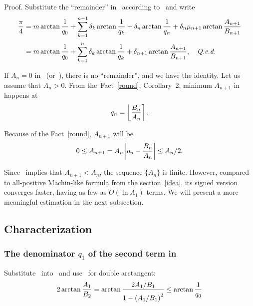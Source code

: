 \documentclass[draft, 10pt]{article} %
\def\fact#1{Fact~\ref{#1}}
\begin{document}
Proof. Substitute the ``remainder'' in~
according to~ and write
$$
\begin{array}{ll}
\dfrac{\pi}{4} = m \arctan\dfrac{1}{q_0}
    + \sum_{k=1}^{n-1} \delta_k \arctan\dfrac{1}{q_k}
    + \delta_n \arctan\dfrac{1}{q_n}
    + \delta_n \mu_{n+1} \arctan\dfrac{A_{n+1}}{B_{n+1}} \\[16pt]
\phantom{\dfrac{\pi}{4}} = m \arctan\dfrac{1}{q_0}
    + \sum_{k=1}^n \delta_k \arctan\dfrac{1}{q_k}
    + \delta_{n+1} \arctan\dfrac{A_{n+1}}{B_{n+1}}, \quad\hbox{\qed}
\end{array}
$$

If $A_n = 0$ in~ (or~),
there is no ``remainder'', and we have the
identity. Let us assume that $A_n > 0$.
From the~\fact{round}, Corollary~2, minimum $A_{n+1}$ in~
happens at
%
\begin{equation}\mlabel{q-next}
q_n = \nround{\dfrac{B_n}{A_n}}.
\end{equation}

Because of the \fact{round}, $A_{n+1}$ will be
%
\begin{equation}\mlabel{decay-a}
0 \le A_{n+1} = A_n \absolute{q_n - \dfrac{B_n}{A_n}} \le A_n / 2.
\end{equation}

Since~ implies that $A_{n+1} < A_n$, the sequence $\{ A_n \}$ is finite.
However, compared to all-positive Machin-like formula from the section~\ref{idea},
its signed version~ converges faster, having as few as
$O(\ln A_1)$ terms. We will present a more meaningful estimation in the next
subsection.

\subsection{Characterization}

\subsubsection{The denominator $q_1$ of the second term in~}

Substitute~ into~ and use~
for double arctangent:
%
\begin{equation}\mlabel{compare-two-terms}
2\arctan \dfrac{A_1}{B_2} = \arctan \dfrac{2A_1/B_1}{1-\left(A_1/B_1\right)^{2\strut}} \le \arctan \dfrac{1}{q_0}
\end{equation}
\end{document}
